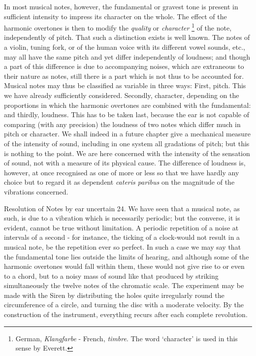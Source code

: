 In most musical notes, however, the fundamental or gravest tone is present in
sufficient intensity to impress its character on the whole.  The effect of the
harmonic overtones is then to modify the \textit{quality} or \textit{character}
\footnote{German, \emph{Klangfarbe} - French, \emph{timbre}.  The word
`character' is used in this sense by Everett.} of the note, independently of
pitch. That such a distinction exists is well known.  The notes of a violin,
tuning fork, or of the human voice with its different vowel sounds, etc., may
all have the same pitch and yet differ independently of loudness; and though a
part of this difference is due to accompanying noises, which are extraneous to
their nature as notes, still there is a part which is not thus to be accounted
for. Musical notes may thus be classified as variable in three ways: First,
pitch.  This we have already sufficiently considered. Secondly, character,
depending on the proportions in which the harmonic overtones are combined with
the fundamental: and thirdly, loudness. This has to be taken last, because the
ear is not capable of comparing (with any precision) the loudness of two notes
which differ much in pitch or character. We shall indeed in a future chapter
give a mechanical measure of the intensity of sound, including in one system
all gradations of pitch; but this is nothing to the point. We are here
concerned with the intensity of the sensation of sound, not with a measure of
its physical cause. The difference of loudness is, however, at once recognised
as one of more or less so that we have hardly any choice but to regard it as
dependent \textit{cateris paribus} on the magnitude of the vibrations
concerned.

Resolution of Notes by ear uncertain 24. We have seen that a musical note, as
such, is due to a vibration which is necessarily periodic; but the converse, it
is evident, cannot be true without limitation. A periodic repetition of a noise
at intervals of a second - for instance, the ticking of a clock-would not
result in a musical note, be the repetition ever so perfect. In such a case we
may say that the fundamental tone lies outside the limits of hearing, and
although some of the harmonic overtones would fall within them, these would not
give rise to or even to a chord, but to a noisy mass of sound like that
produced by striking simultaneously the twelve notes of the chromatic scale.
The experiment may be made with the Siren by distributing the holes quite
irregularly round the circumference of a circle, and turning the disc with a
moderate velocity. By the construction of the instrument, everything recurs
after each complete revolution.

